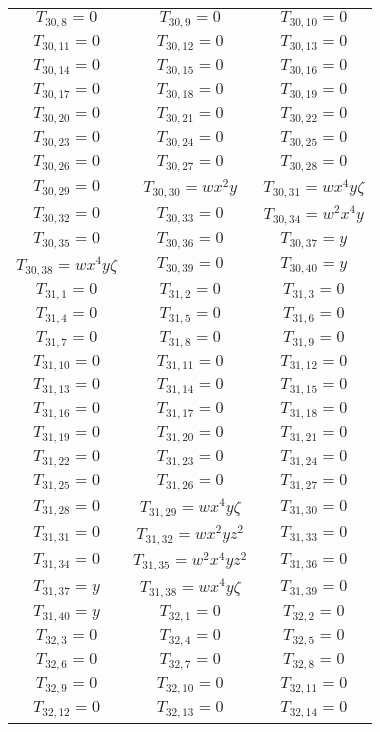\documentclass[12pt]{memoireuqam1.3}
\begin{document}
\begin{longtable}{|c|c|c|}
$T_{30,8}= 0$&
$T_{30,9}= 0$&
$T_{30,10}= 0$\\
$T_{30,11}= 0$&
$T_{30,12}= 0$&
$T_{30,13}= 0$\\
$T_{30,14}= 0$&
$T_{30,15}= 0$&
$T_{30,16}= 0$\\
$T_{30,17}= 0$&
$T_{30,18}= 0$&
$T_{30,19}= 0$\\
$T_{30,20}= 0$&
$T_{30,21}= 0$&
$T_{30,22}= 0$\\
$T_{30,23}= 0$&
$T_{30,24}= 0$&
$T_{30,25}= 0$\\
$T_{30,26}= 0$&
$T_{30,27}= 0$&
$T_{30,28}= 0$\\
$T_{30,29}= 0$&
$T_{30,30}= wx^2y$&
$T_{30,31}= wx^4y\zeta$\\
$T_{30,32}= 0$&
$T_{30,33}= 0$&
$T_{30,34}= w^2x^4y$\\
$T_{30,35}= 0$&
$T_{30,36}= 0$&
$T_{30,37}= y$\\
$T_{30,38}= wx^4y\zeta$&
$T_{30,39}= 0$&
$T_{30,40}= y$\\
$T_{31,1}= 0$&
$T_{31,2}= 0$&
$T_{31,3}= 0$\\
$T_{31,4}= 0$&
$T_{31,5}= 0$&
$T_{31,6}= 0$\\
$T_{31,7}= 0$&
$T_{31,8}= 0$&
$T_{31,9}= 0$\\
$T_{31,10}= 0$&
$T_{31,11}= 0$&
$T_{31,12}= 0$\\
$T_{31,13}= 0$&
$T_{31,14}= 0$&
$T_{31,15}= 0$\\
$T_{31,16}= 0$&
$T_{31,17}= 0$&
$T_{31,18}= 0$\\
$T_{31,19}= 0$&
$T_{31,20}= 0$&
$T_{31,21}= 0$\\
$T_{31,22}= 0$&
$T_{31,23}= 0$&
$T_{31,24}= 0$\\
$T_{31,25}= 0$&
$T_{31,26}= 0$&
$T_{31,27}= 0$\\
$T_{31,28}= 0$&
$T_{31,29}= wx^4y\zeta$&
$T_{31,30}= 0$\\
$T_{31,31}= 0$&
$T_{31,32}= wx^2yz^2$&
$T_{31,33}= 0$\\
$T_{31,34}= 0$&
$T_{31,35}= w^2x^4yz^2$&
$T_{31,36}= 0$\\
$T_{31,37}= y$&
$T_{31,38}= wx^4y\zeta$&
$T_{31,39}= 0$\\
$T_{31,40}= y$&
$T_{32,1}= 0$&
$T_{32,2}= 0$\\
$T_{32,3}= 0$&
$T_{32,4}= 0$&
$T_{32,5}= 0$\\
$T_{32,6}= 0$&
$T_{32,7}= 0$&
$T_{32,8}= 0$\\
$T_{32,9}= 0$&
$T_{32,10}= 0$&
$T_{32,11}= 0$\\
$T_{32,12}= 0$&
$T_{32,13}= 0$&
$T_{32,14}= 0$\\

\end{longtable}
\end{document}
